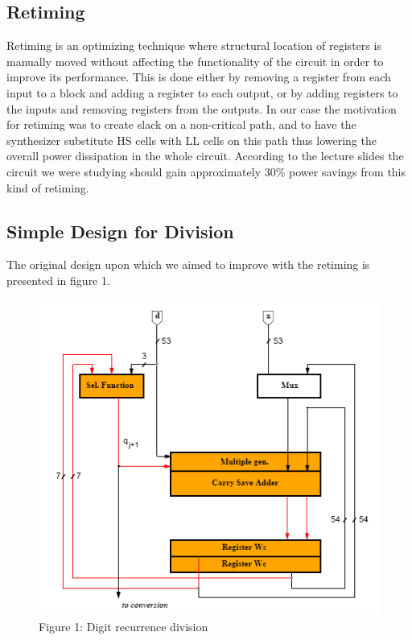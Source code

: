 \documentclass[11pt,a4paper]{article}
\begin{document}
\subsection{Retiming}
Retiming is an optimizing technique where structural location of registers is manually moved without affecting the functionality of the circuit in order to improve its performance. This is done either by removing a register from each input to a block and adding a register to each output, or by adding registers to the inputs and removing registers from the outputs.
In our case the motivation for retiming was to create slack on a non-critical path, and to have the synthesizer substitute HS cells with LL cells on this path thus lowering the overall power dissipation in the whole circuit. According to the lecture slides the circuit we were studying should gain approximately 30\% power savings from this kind of retiming.

\subsection{Simple Design for Division}
The original design upon which we aimed to improve with the retiming is presented in figure 1.

\begin{figure}
	\centering
		\includegraphics{./noretiming.PNG}
	\caption{Figure 1: Digit recurrence division}
	\label{fig:noretiming}
\end{figure}
\end{document}
